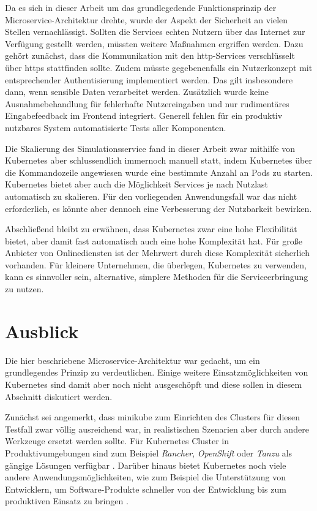 \documentclass[11pt,a4paper]{article}
\begin{document}
Da es sich in dieser Arbeit um das grundlegedende Funktionsprinzip der Microservice-Architektur drehte,
wurde der Aspekt der Sicherheit an vielen Stellen vernachlässigt. Sollten die Services echten
Nutzern über das Internet zur Verfügung gestellt werden, müssten weitere Maßnahmen ergriffen werden.
Dazu gehört zunächst, dass die Kommunikation mit den http-Services verschlüsselt über https
stattfinden sollte. Zudem müsste gegebenenfalls ein Nutzerkonzept mit entsprechender
Authentisierung implementiert werden. Das gilt insbesondere dann, wenn sensible
Daten verarbeitet werden. Zusätzlich wurde keine Ausnahmebehandlung für fehlerhafte
Nutzereingaben und nur rudimentäres Eingabefeedback im Frontend integriert.
Generell fehlen für ein produktiv nutzbares System automatisierte Tests
aller Komponenten.

Die Skalierung des Simulationsservice fand in dieser Arbeit zwar mithilfe von Kubernetes
aber schlussendlich immernoch manuell statt, indem Kubernetes über die Kommandozeile angewiesen wurde
eine bestimmte Anzahl an Pods zu starten. Kubernetes bietet aber auch die Möglichkeit 
Services je nach Nutzlast automatisch zu skalieren. Für den vorliegenden 
Anwendungsfall war das nicht erforderlich, es könnte aber dennoch eine Verbesserung 
der Nutzbarkeit bewirken.

Abschließend bleibt zu erwähnen, dass Kubernetes zwar eine hohe Flexibilität bietet,
aber damit fast automatisch auch eine hohe Komplexität hat. Für große Anbieter von Onlinediensten
ist der Mehrwert durch diese Komplexität sicherlich vorhanden.
Für kleinere Unternehmen, die überlegen, Kubernetes zu verwenden, kann es sinnvoller sein,
alternative, simplere Methoden für die Serviceerbringung zu nutzen.

\section{Ausblick}
Die hier beschriebene Microservice-Architektur war gedacht, um ein grundlegendes Prinzip
zu verdeutlichen. Einige weitere Einsatzmöglichkeiten von Kubernetes sind damit aber noch nicht ausgeschöpft 
und diese sollen in diesem Abschnitt diskutiert werden.

Zunächst sei angemerkt, dass minikube zum Einrichten des Clusters für diesen Testfall
zwar völlig ausreichend war, in realistischen Szenarien aber durch andere Werkzeuge ersetzt werden sollte.
Für Kubernetes Cluster in Produktivumgebungen sind zum Beispiel \emph{Rancher}, \emph{OpenShift} oder \emph{Tanzu} als
gängige Lösungen verfügbar \cite{rancher}. Darüber hinaus bietet Kubernetes noch viele andere 
Anwendungsmöglichkeiten, wie zum Beispiel die Unterstützung von Entwicklern, um Software-Produkte
schneller von der Entwicklung bis zum produktiven Einsatz zu bringen \cite{Schmeling_Dargatz_2022}.
\end{document}
